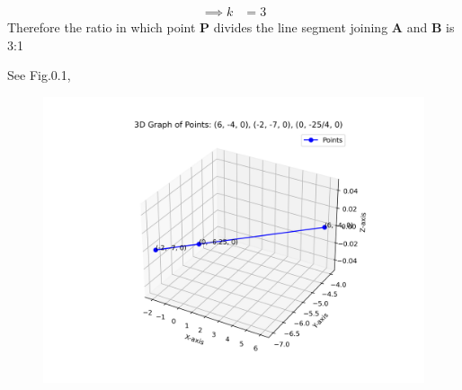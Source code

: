 \documentclass[journal]{IEEEtran}
\begin{document}
\begin{align}
\implies k &= 3
\end{align}
 Therefore the ratio in which point \textbf{P} divides the line segment joining \textbf{A} and \textbf{B} is 3:1

See Fig.0.1,
\begin{figure}[H]
\begin{center}
\includegraphics[width=0.7\columnwidth]{Figs/graph3d.png}
\end{center}
\caption{}
\label{fig:fig.py}
\end{figure}
\end{document}
